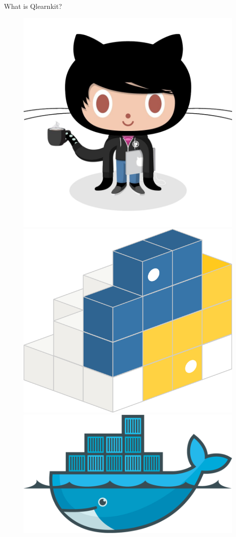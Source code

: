 \begin{frame}{What is Qlearnkit?}
\begin{itemize}
        \begin{figure}
            \centering
            \begin{minipage}[c]{0.3\textwidth}
    			\includegraphics[width=0.55\linewidth]{codercat}
    		\end{minipage}
    		\begin{minipage}[c]{0.3\textwidth}
    			\includegraphics[width=0.4\linewidth]{pypilogo}
    		\end{minipage}
            \begin{minipage}[c]{0.3\textwidth}
			    \includegraphics[width=0.6\linewidth]{docker-logo}
    		\end{minipage}
        \end{figure}
		
    \end{itemize}
\end{frame}


